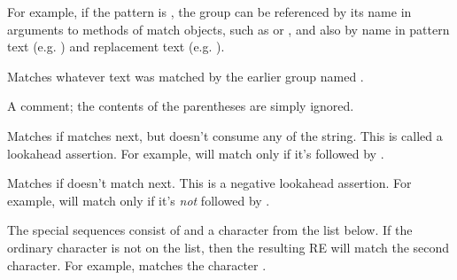\begin{list}{}{\leftmargin \MyLeftMargin {} \MyLabelWidth}
For example, if the pattern is
, the group can be referenced by its
name in arguments to methods of match objects, such as 
or , and also by name in pattern text
(e.g. ) and replacement text (e.g. ).
%
\item[\code{(?P=\var{name})}] Matches whatever text was matched by the
earlier group named .
%
\item[\code{(?\#...)}] A comment; the contents of the parentheses are
simply ignored.
%
\item[\code{(?=...)}] Matches if  matches next, but doesn't
consume any of the string.  This is called a lookahead assertion.  For
example,  will match  only if it's
followed by .
%
\item[\code{(?!...)}] Matches if  doesn't match next.  This
is a negative lookahead assertion.  For example,
 will match  only if it's \emph{not}
followed by .

\end{list}

The special sequences consist of \character{\e} and a character from the
list below.  If the ordinary character is not on the list, then the
resulting RE will match the second character.  For example,
\regexp{\e\$} matches the character \character{\$}.


